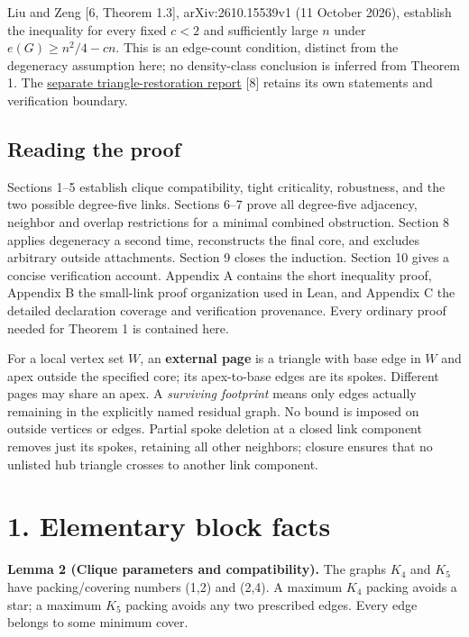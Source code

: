 \documentclass[11pt]{article}
\begin{document}
Liu and Zeng {[}6, Theorem 1.3{]}, arXiv:2610.15539v1 (11 October 2026),
establish the inequality for every fixed \(c<2\) and sufficiently large
\(n\) under \(e(G)\ge n^2/4-cn\). This is an edge-count condition,
distinct from the degeneracy assumption here; no density-class
conclusion is inferred from Theorem 1. The
\href{https://github.com/pappa211/ai-math-experiments/blob/main/papers/tuza-triangle-restoration/main.md}{separate
triangle-restoration report} {[}8{]} retains its own statements and
verification boundary.

\subsection{Reading the proof}\label{reading-the-proof}

Sections 1--5 establish clique compatibility, tight criticality,
robustness, and the two possible degree-five links. Sections 6--7 prove
all degree-five adjacency, neighbor and overlap restrictions for a
minimal combined obstruction. Section 8 applies degeneracy a second
time, reconstructs the final core, and excludes arbitrary outside
attachments. Section 9 closes the induction. Section 10 gives a concise
verification account. Appendix A contains the short inequality proof,
Appendix B the small-link proof organization used in Lean, and Appendix
C the detailed declaration coverage and verification provenance. Every
ordinary proof needed for Theorem 1 is contained here.

For a local vertex set \(W\), an \textbf{external page} is a triangle
with base edge in \(W\) and apex outside the specified core; its
apex-to-base edges are its spokes. Different pages may share an apex. A
\emph{surviving footprint} means only edges actually remaining in the
explicitly named residual graph. No bound is imposed on outside vertices
or edges. Partial spoke deletion at a closed link component removes just
its spokes, retaining all other neighbors; closure ensures that no
unlisted hub triangle crosses to another link component.

\section{1. Elementary block facts}\label{elementary-block-facts}

\textbf{Lemma 2 (Clique parameters and compatibility).} The graphs
\(K_4\) and \(K_5\) have packing/covering numbers (1,2) and (2,4). A
maximum \(K_4\) packing avoids a star; a maximum \(K_5\) packing avoids
any two prescribed edges. Every edge belongs to some minimum cover.
\end{document}
